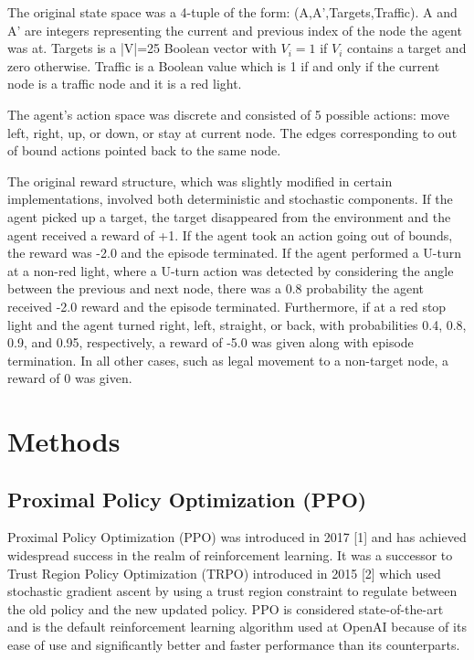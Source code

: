 \documentclass{article}
\begin{document}
	The original state space was a 4-tuple of the form: (A,A',Targets,Traffic). A and A' are integers representing the current and previous index of the node the agent was at. Targets is a |V|=25 Boolean vector with $V_{i}=1$ if $V_i$ contains a target and zero otherwise. Traffic is a Boolean value which is 1 if and only if the current node is a traffic node and it is a red light.
	
	The agent's action space was discrete and consisted of 5 possible actions: move left, right, up, or down, or stay at current node. The edges corresponding to out of bound actions pointed back to the same node.
	
	The original reward structure, which was slightly modified in certain implementations, involved both deterministic and stochastic components. If the agent picked up a target, the target disappeared from the environment and the agent received a reward of +1. If the agent took an action going out of bounds, the reward was -2.0 and the episode terminated. If the agent performed a U-turn at a non-red light, where a U-turn action was detected by considering the angle between the previous and next node, there was a 0.8 probability the agent received -2.0 reward and the episode terminated. Furthermore, if at a red stop light and the agent turned right, left, straight, or back, with probabilities 0.4, 0.8, 0.9, and 0.95, respectively, a reward of -5.0 was given along with episode termination. In all other cases, such as legal movement to a non-target node, a reward of 0 was given.
	
	\section{Methods}
	\subsection{Proximal Policy Optimization (PPO)}
	\label{ppo}
	
	Proximal Policy Optimization (PPO) was introduced in 2017 [1] and has achieved widespread success in the realm of reinforcement learning. It was a successor to Trust Region Policy Optimization (TRPO) introduced in 2015 [2] which used stochastic gradient ascent by using a trust region constraint to regulate between the old policy and the new updated policy. PPO is considered state-of-the-art and is the default reinforcement learning algorithm used at OpenAI because of its ease of use and significantly better and faster performance than its counterparts. 
	
\end{document}
